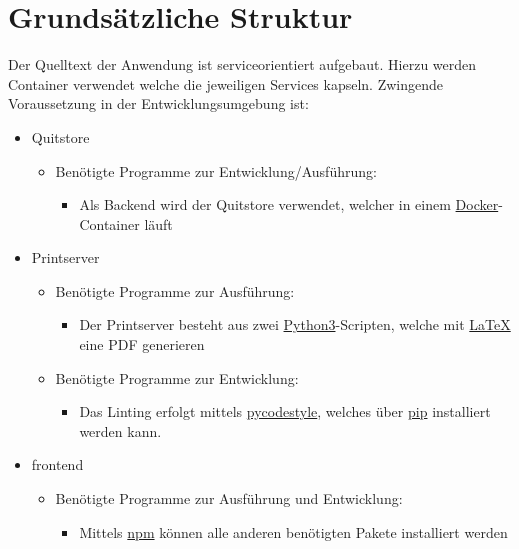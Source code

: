 \documentclass[a4paper,11pt,oneside, titlepage]{article}
\begin{document}
\section{Grundsätzliche Struktur}
Der Quelltext der Anwendung ist serviceorientiert aufgebaut. Hierzu werden Container verwendet welche die jeweiligen Services kapseln. Zwingende Voraussetzung in der Entwicklungsumgebung ist: 
\begin{itemize}
	\item Quitstore
	\begin{itemize}
		\item Benötigte Programme zur Entwicklung/Ausführung:
		\begin{itemize}
			\item Als Backend wird der Quitstore verwendet, welcher in einem \href{https://www.docker.com/get-docker}{Docker}-Container läuft
		\end{itemize}
	\end{itemize}	
	\item Printserver
	\begin{itemize}
		\item Benötigte Programme zur Ausführung:
		\begin{itemize}
			\item Der Printserver besteht aus zwei \href{https://docs.python.org/3/}{Python3}-Scripten, welche mit \href{https://www.latex-project.org/help/documentation/}{\LaTeX} eine PDF generieren
		\end{itemize}
		\item Benötigte Programme zur Entwicklung:
		\begin{itemize}
			\item Das Linting erfolgt mittels \href{https://pypi.python.org/pypi/pycodestyle}{pycodestyle}, welches über \href{https://pypi.python.org/pypi/pip}{pip} installiert werden kann.
		\end{itemize}
	\end{itemize}
	\item frontend
	\begin{itemize}
		\item Benötigte Programme zur Ausführung und Entwicklung:
		\begin{itemize}
			\item Mittels \href{https://docs.npmjs.com/}{npm} können alle anderen benötigten Pakete installiert werden
		\end{itemize}
	\end{itemize}
\end{itemize}
\end{document}
